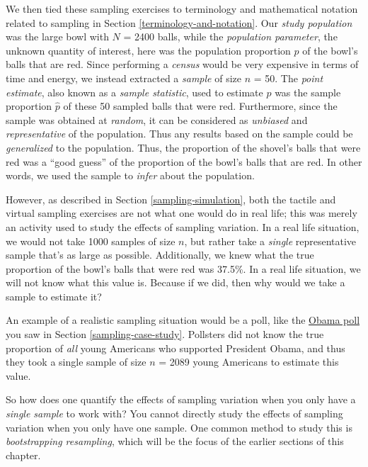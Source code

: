\documentclass[
]{book}
\begin{document}
We then tied these sampling exercises to terminology and mathematical notation related to sampling in Section \ref{terminology-and-notation}. Our \emph{study population} was the large bowl with \(N\) = 2400 balls, while the \emph{population parameter}, the unknown quantity of interest, here was the population proportion \(p\) of the bowl's balls that are red. Since performing a \emph{census} would be very expensive in terms of time and energy, we instead extracted a \emph{sample} of size \(n\) = 50. The \emph{point estimate}, also known as a \emph{sample statistic}, used to estimate \(p\) was the sample proportion \(\widehat{p}\) of these 50 sampled balls that were red. Furthermore, since the sample was obtained at \emph{random}, it can be considered as \emph{unbiased} and \emph{representative} of the population. Thus any results based on the sample could be \emph{generalized} to the population. Thus, the proportion of the shovel's balls that were red was a ``good guess'' of the proportion of the bowl's balls that are red. In other words, we used the sample to \emph{infer} about the population.

However, as described in Section \ref{sampling-simulation}, both the tactile and virtual sampling exercises are not what one would do in real life; this was merely an activity used to study the effects of sampling variation. In a real life situation, we would not take 1000 samples of size \(n\), but rather take a \emph{single} representative sample that's as large as possible. Additionally, we knew what the true proportion of the bowl's balls that were red was 37.5\%. In a real life situation, we will not know what this value is. Because if we did, then why would we take a sample to estimate it?

An example of a realistic sampling situation would be a poll, like the \href{https://www.npr.org/sections/itsallpolitics/2013/12/04/248793753/poll-support-for-obama-among-young-americans-eroding}{Obama poll} you saw in Section \ref{sampling-case-study}. Pollsters did not know the true proportion of \emph{all} young Americans who supported President Obama, and thus they took a single sample of size \(n\) = 2089 young Americans to estimate this value.

So how does one quantify the effects of sampling variation when you only have a \emph{single sample} to work with? You cannot directly study the effects of sampling variation when you only have one sample. One common method to study this is \emph{bootstrapping resampling}, which will be the focus of the earlier sections of this chapter.
\end{document}
